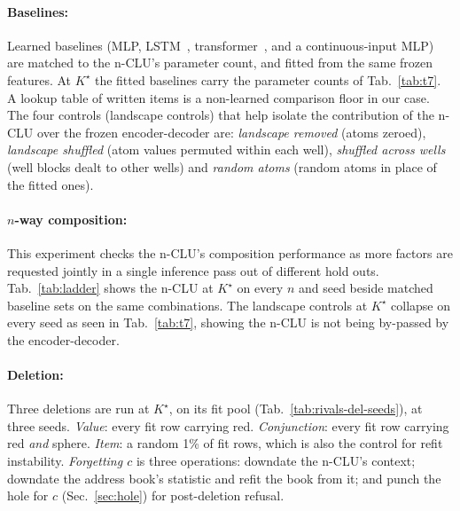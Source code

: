 \documentclass{article} %
\newcommand{\Kstar}{\ensuremath{K^{\star}}}
\begin{document}
\paragraph{Baselines:}

Learned baselines (MLP, LSTM~\citep{hochreiter_long_1997}, transformer~\citep{vaswani_attention_2023}, and a
continuous-input MLP) are matched to the n-CLU's parameter count, and fitted from the same frozen features. At $\Kstar$ the fitted baselines carry the parameter counts of Tab.~\ref{tab:t7}.
A lookup table
of written items is a non-learned comparison floor in our case. The four controls (landscape controls) that help isolate the contribution of the n-CLU over the frozen encoder-decoder are: \emph{landscape removed} (atoms zeroed), \emph{landscape shuffled} (atom values permuted within each well), \emph{shuffled across wells}
(well blocks dealt to other wells) and \emph{random atoms} (random atoms in place of the fitted ones).

\paragraph{$n$-way composition:}

This experiment checks the n-CLU's composition performance as more factors are requested jointly in a single inference pass out of different hold outs. Tab.~\ref{tab:ladder} shows the n-CLU at $\Kstar$ on every $n$ and
seed beside matched baseline sets on the same combinations.
The landscape controls at $\Kstar$ collapse on every seed as seen in Tab.~\ref{tab:t7}, showing the n-CLU is not being by-passed by the encoder-decoder. 

\paragraph{Deletion:}

Three deletions are run at $\Kstar$, on its fit pool (Tab.~\ref{tab:rivals-del-seeds}), at three %
seeds. \emph{Value}: every fit row carrying red. \emph{Conjunction}: every fit row carrying red
\emph{and} sphere. \emph{Item}: a random 1\% of fit rows, which is
also the control for refit instability. \emph{Forgetting $c$} is three operations:
downdate the n-CLU's context; downdate the address book's statistic and refit the book from it; and punch the
hole for $c$ (Sec.~\ref{sec:hole}) for post-deletion refusal.
\end{document}
